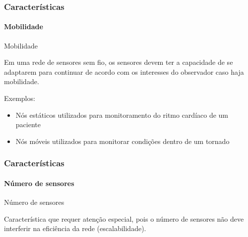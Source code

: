 \documentclass[notes]{beamer}
\begin{document}
\begin{frame}
\label{slide_18}
\frametitle{Características}
\framesubtitle{Mobilidade}

\begin{block}{Mobilidade}

Em uma rede de sensores sem fio, os sensores devem ter a capacidade de se adaptarem para continuar de acordo com os interesses do observador caso haja mobilidade.
\end{block} \pause

\begin{exampleblock}

Exemplos: \pause

\begin{itemize}
\item Nós estáticos utilizados para monitoramento do ritmo cardíaco de um paciente \pause
\item Nós móveis utilizados para monitorar condições dentro de um tornado~\nocite{Twister}
\end{itemize}

\end{exampleblock}

\end{frame}

\begin{frame}
\label{slide_19}
\frametitle{Características}
\framesubtitle{Número de sensores}

\begin{block}{Número de sensores}

Característica que requer atenção especial, pois o número de sensores não deve interferir na eficiência da rede (escalabilidade).
\end{block}

\end{frame}
\end{document}
